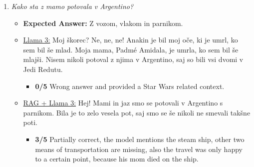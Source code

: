 \documentclass[fleqn,moreauthors,10pt]{ds_report}
\begin{document}
\begin{appendices}
\begin{enumerate}
                \item  \textit{Kako sta z mamo potovala v Argentino?}
                \begin{itemize}
                    \item \textbf{Expected Answer:} Z vozom, vlakom in parnikom.
                    \item \underline{Llama 3:} Moj škorec? Ne, ne, ne! Anakin je bil moj oče, ki je umrl, ko sem bil še mlad. Moja mama, Padmé Amidala, je umrla, ko sem bil še mlajši. Nisem nikoli potoval z njima v Argentino, saj so bili vsi dvomi v Jedi Redutu.
                    \begin{itemize}
                        \item \textbf{0/5} Wrong answer and provided a Star Wars related context. 
                    \end{itemize}
                    \item \underline{RAG + Llama 3:} Hej! Mami in jaz smo se potovali v Argentino s parnikom. Bila je to zelo vesela pot, saj smo se še nikoli ne smevali takšne poti.
                    \begin{itemize}
                        \item \textbf{3/5} Partially correct, the model mentions the steam ship, other two means of transportation are missing, also the travel was only happy to a certain point, because his mom died on the ship.
                    \end{itemize}
                \end{itemize}



\end{enumerate}
\end{appendices}
\end{document}

